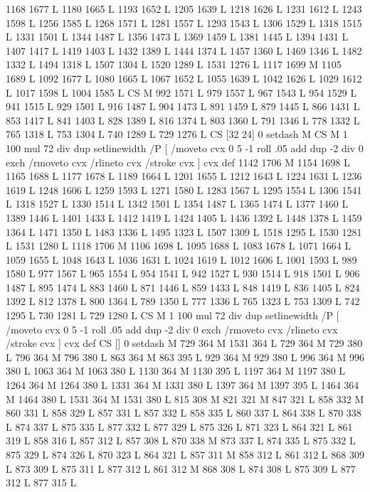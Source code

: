{{{{{{{{{{{{{{{{{{{{{{{{1168 1677 L
1180 1665 L
1193 1652 L
1205 1639 L
1218 1626 L
1231 1612 L
1243 1598 L
1256 1585 L
1268 1571 L
1281 1557 L
1293 1543 L
1306 1529 L
1318 1515 L
1331 1501 L
1344 1487 L
1356 1473 L
1369 1459 L
1381 1445 L
1394 1431 L
1407 1417 L
1419 1403 L
1432 1389 L
1444 1374 L
1457 1360 L
1469 1346 L
1482 1332 L
1494 1318 L
1507 1304 L
1520 1289 L
1531 1276 L
1117 1699 M 1105 1689 L
1092 1677 L
1080 1665 L
1067 1652 L
1055 1639 L
1042 1626 L
1029 1612 L
1017 1598 L
1004 1585 L
CS M
992 1571 L
979 1557 L
967 1543 L
954 1529 L
941 1515 L
929 1501 L
916 1487 L
904 1473 L
891 1459 L
879 1445 L
866 1431 L
853 1417 L
841 1403 L
828 1389 L
816 1374 L
803 1360 L
791 1346 L
778 1332 L
765 1318 L
753 1304 L
740 1289 L
729 1276 L
CS [32 24] 0 setdash M
CS M 1 100 mul 72 div dup setlinewidth
/P [ /moveto cvx 0 5 -1 roll .05 add dup -2 div 0 exch /rmoveto cvx /rlineto cvx /stroke cvx ] cvx def
1142 1706 M 1154 1698 L
1165 1688 L
1177 1678 L
1189 1664 L
1201 1655 L
1212 1643 L
1224 1631 L
1236 1619 L
1248 1606 L
1259 1593 L
1271 1580 L
1283 1567 L
1295 1554 L
1306 1541 L
1318 1527 L
1330 1514 L
1342 1501 L
1354 1487 L
1365 1474 L
1377 1460 L
1389 1446 L
1401 1433 L
1412 1419 L
1424 1405 L
1436 1392 L
1448 1378 L
1459 1364 L
1471 1350 L
1483 1336 L
1495 1323 L
1507 1309 L
1518 1295 L
1530 1281 L
1531 1280 L
1118 1706 M 1106 1698 L
1095 1688 L
1083 1678 L
1071 1664 L
1059 1655 L
1048 1643 L
1036 1631 L
1024 1619 L
1012 1606 L
1001 1593 L
989 1580 L
977 1567 L
965 1554 L
954 1541 L
942 1527 L
930 1514 L
918 1501 L
906 1487 L
895 1474 L
883 1460 L
871 1446 L
859 1433 L
848 1419 L
836 1405 L
824 1392 L
812 1378 L
800 1364 L
789 1350 L
777 1336 L
765 1323 L
753 1309 L
742 1295 L
730 1281 L
729 1280 L
CS M 1 100 mul 72 div dup setlinewidth
/P [ /moveto cvx 0 5 -1 roll .05 add dup -2 div 0 exch /rmoveto cvx /rlineto cvx /stroke cvx ] cvx def
CS [] 0 setdash M
729 364 M 1531 364 L
729 364 M 729 380 L
796 364 M 796 380 L
863 364 M 863 395 L
929 364 M 929 380 L
996 364 M 996 380 L
1063 364 M 1063 380 L
1130 364 M 1130 395 L
1197 364 M 1197 380 L
1264 364 M 1264 380 L
1331 364 M 1331 380 L
1397 364 M 1397 395 L
1464 364 M 1464 380 L
1531 364 M 1531 380 L
815 308 M 821 321 M 847 321 L
858 332 M 860 331 L
858 329 L
857 331 L
857 332 L
858 335 L
860 337 L
864 338 L
870 338 L
874 337 L
875 335 L
877 332 L
877 329 L
875 326 L
871 323 L
864 321 L
861 319 L
858 316 L
857 312 L
857 308 L
870 338 M 873 337 L
874 335 L
875 332 L
875 329 L
874 326 L
870 323 L
864 321 L
857 311 M 858 312 L
861 312 L
868 309 L
873 309 L
875 311 L
877 312 L
861 312 M 868 308 L
874 308 L
875 309 L
877 312 L
877 315 L
}}}}}}}}}}}}}}}}}}}}}}}}
